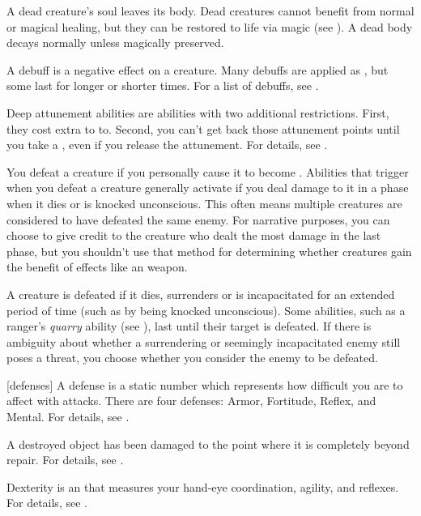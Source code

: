  A dead creature's soul leaves its body. Dead creatures cannot benefit from normal or magical healing, but they can be restored to life via magic (see ). A dead body decays normally unless magically preserved.

 A debuff is a negative effect on a creature.
Many debuffs are applied as , but some last for longer or shorter times.
For a list of debuffs, see .

 Deep attunement abilities are  abilities with two additional restrictions.
First, they cost extra  to  to.
Second, you can't get back those attunement points until you take a , even if you release the attunement.
For details, see .

 You defeat a creature if you personally cause it to become .
Abilities that trigger when you defeat a creature generally activate if you deal damage to it in a phase when it dies or is knocked unconscious.
This often means multiple creatures are considered to have defeated the same enemy.
For narrative purposes, you can choose to give credit to the creature who dealt the most damage in the last phase, but you shouldn't use that method for determining whether creatures gain the benefit of effects like an  weapon.

 A creature is defeated if it dies, surrenders or is incapacitated for an extended period of time (such as by being knocked unconscious).
Some abilities, such as a ranger's \textit{quarry} ability (see ), last until their target is defeated.
If there is ambiguity about whether a surrendering or seemingly incapacitated enemy still poses a threat, you choose whether you consider the enemy to be defeated.

[defenses] A defense is a static number which represents how difficult you are to affect with attacks.
There are four defenses: Armor, Fortitude, Reflex, and Mental.
For details, see .

 A destroyed object has been damaged to the point where it is completely beyond repair.
For details, see .

 Dexterity is an  that measures your hand-eye coordination, agility, and reflexes.
For details, see .


